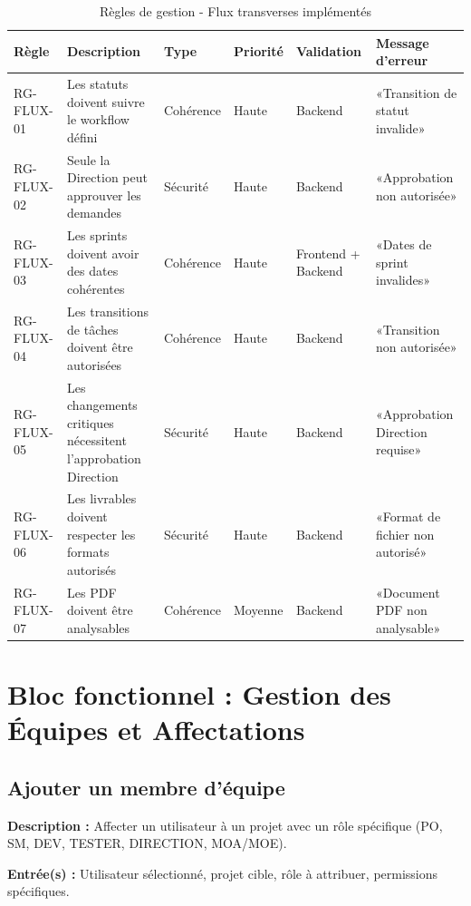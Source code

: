     \begin{table}[H]
        \centering
\footnotesize
\begin{tabular}{|p{1.5cm}|p{3.5cm}|p{1.5cm}|p{1.5cm}|p{2cm}|p{2.5cm}|}
\hline
\textbf{Règle} & \textbf{Description} & \textbf{Type} & \textbf{Priorité} & \textbf{Validation} & \textbf{Message d'erreur} \\
\hline
RG-FLUX-01 & Les statuts doivent suivre le workflow défini & Cohérence & Haute & Backend & «Transition de statut invalide» \\
\hline
RG-FLUX-02 & Seule la Direction peut approuver les demandes & Sécurité & Haute & Backend & «Approbation non autorisée» \\
\hline
RG-FLUX-03 & Les sprints doivent avoir des dates cohérentes & Cohérence & Haute & Frontend + Backend & «Dates de sprint invalides» \\
            \hline
RG-FLUX-04 & Les transitions de tâches doivent être autorisées & Cohérence & Haute & Backend & «Transition non autorisée» \\
            \hline
RG-FLUX-05 & Les changements critiques nécessitent l'approbation Direction & Sécurité & Haute & Backend & «Approbation Direction requise» \\
            \hline
RG-FLUX-06 & Les livrables doivent respecter les formats autorisés & Sécurité & Haute & Backend & «Format de fichier non autorisé» \\
            \hline
RG-FLUX-07 & Les PDF doivent être analysables & Cohérence & Moyenne & Backend & «Document PDF non analysable» \\
            \hline
        \end{tabular}
\caption{Règles de gestion - Flux transverses implémentés}
\label{tab:rg_flux}
    \end{table}
\label{sec:chap3_parametrage}

\section{Bloc fonctionnel : Gestion des Équipes et Affectations}

\subsection{Ajouter un membre d'équipe}
\textbf{Description :} Affecter un utilisateur à un projet avec un rôle spécifique (PO, SM, DEV, TESTER, DIRECTION, MOA/MOE).

\textbf{Entrée(s) :} Utilisateur sélectionné, projet cible, rôle à attribuer, permissions spécifiques.

